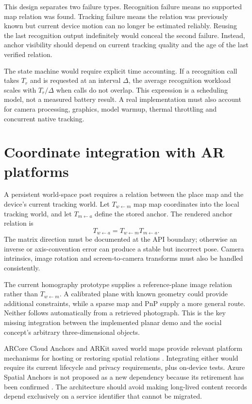 This design separates two failure types. Recognition failure means no supported map relation was found. Tracking failure means the relation was previously known but current device motion can no longer be estimated reliably. Reusing the last recognition output indefinitely would conceal the second failure. Instead, anchor visibility should depend on current tracking quality and the age of the last verified relation.

The state machine would require explicit time accounting. If a recognition call takes $T_r$ and is requested at an interval $\Delta$, the average recognition workload scales with $T_r/\Delta$ when calls do not overlap. This expression is a scheduling model, not a measured battery result. A real implementation must also account for camera processing, graphics, model warmup, thermal throttling and concurrent native tracking.

\ifFullReport
\section{Coordinate integration with AR platforms}
A persistent world-space post requires a relation between the place map and the device's current tracking world. Let $T_{w\leftarrow m}$ map map coordinates into the local tracking world, and let $T_{m\leftarrow a}$ define the stored anchor. The rendered anchor relation is
\begin{equation}
 T_{w\leftarrow a}=T_{w\leftarrow m}T_{m\leftarrow a}.
\end{equation}
The matrix direction must be documented at the API boundary; otherwise an inverse or axis-convention error can produce a stable but incorrect pose. Camera intrinsics, image rotation and screen-to-camera transforms must also be handled consistently.

The current homography prototype supplies a reference-plane image relation rather than $T_{w\leftarrow m}$. A calibrated plane with known geometry could provide additional constraints, while a sparse map and PnP supply a more general route. Neither follows automatically from a retrieved photograph. This is the key missing integration between the implemented planar demo and the social concept's arbitrary three-dimensional objects.

ARCore Cloud Anchors and ARKit saved world maps provide relevant platform mechanisms for hosting or restoring spatial relations \citep{arcore,arkit}. Integrating either would require its current lifecycle and privacy requirements, plus on-device tests. Azure Spatial Anchors is not proposed as a new dependency because its retirement has been confirmed \citep{azure}. The architecture should avoid making long-lived content records depend exclusively on a service identifier that cannot be migrated.
\fi

